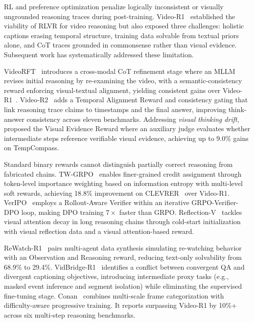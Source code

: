 \documentclass[10pt]{article} %
\begin{document}
RL and preference optimization penalize logically inconsistent or visually ungrounded reasoning traces during post-training. Video-R1~\citep{Feng2025VideoR1RV} established the viability of RLVR for video reasoning but also exposed three challenges: holistic captions erasing temporal structure, training data solvable from textual priors alone, and CoT traces grounded in commonsense rather than visual evidence. Subsequent work has systematically addressed these limitation.

VideoRFT~\citep{Wang2025VideoRFTIV} introduces a cross-modal CoT refinement stage where an MLLM revises initial reasoning by re-examining the video, with a semantic-consistency reward enforcing visual-textual alignment, yielding consistent gains over Video-R1~\citep{Feng2025VideoR1RV}. Video-R2~\citep{Maaz2025VideoR2RC} adds a Temporal Alignment Reward and consistency gating that link reasoning trace claims to timestamps and the final answer, improving think-answer consistency across eleven benchmarks. %
Addressing \emph{visual thinking drift}, \citet{Luo2025WhenTD} proposed the Visual Evidence Reward where an auxiliary judge evaluates whether intermediate steps reference verifiable visual evidence, achieving up to 9.0\% gains on TempCompass.

Standard binary rewards cannot distinguish partially correct reasoning from fabricated chains. TW-GRPO~\citep{Dang2025ReinforcingVR} enables finer-grained credit assignment through token-level importance weighting based on information entropy with multi-level soft rewards, achieving 18.8\% improvement on CLEVRER~\citep{yi2019clevrer} over Video-R1. VerIPO~\citep{Li2025VerIPOCL} employs a Rollout-Aware Verifier within an iterative GRPO-Verifier-DPO loop, making DPO training $7\times$ faster than GRPO. Reflection-V~\citep{Jian2025LookAT} tackles visual attention decay in long reasoning chains through cold-start initialization with visual reflection data and a visual attention-based reward.

ReWatch-R1~\citep{Zhang2025ReWatchR1BC} pairs multi-agent data synthesis simulating re-watching behavior with an Observation and Reasoning reward, reducing text-only solvability from 68.9\% to 29.4\%. VidBridge-R1~\citep{Chen2025VidBridgeR1BQ} identifies a conflict between convergent QA and divergent captioning objectives, introducing intermediate proxy tasks (e.g., masked event inference and segment isolation) while eliminating the supervised fine-tuning stage. Conan~\citep{Ouyang2025ConanPL} combines multi-scale frame categorization with difficulty-aware progressive training. It reports surpassing Video-R1 by 10\%+ across six multi-step reasoning benchmarks.
\end{document}
